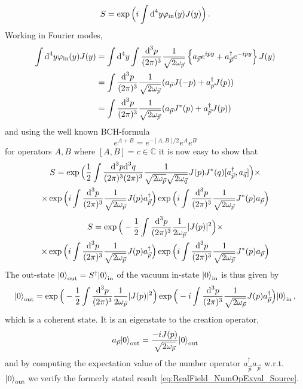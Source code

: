 \begin{equation}
    S=\exp\Big({i}\int\text{d}^4y\varphi_{\text{in}}(y)J(y)\Big)\,.
\end{equation}
Working in Fourier modes,
\begin{align}
    \int\text{d}^4y\varphi_{\text{in}}(y)J(y)&=\int\text{d}^4y\int\frac{\text{d} ^3p}{(2\pi)^3}\frac{1}{\sqrt{2\omega_{\vec{p}}}}\left\{a_{\vec{p}}e^{{i} py}+a_{\vec{p}}^\dagger e^{-{i} py}\right\}J(y)\\
    &=\int\frac{\text{d} ^3p}{(2\pi)^3}\frac{1}{\sqrt{2\omega_{\vec{p}}}}(a_{\vec{p}}J(-p)+a_{\vec{p}}^\dagger J(p))\\
    &=\int\frac{\text{d} ^3p}{(2\pi)^3}\frac{1}{\sqrt{2\omega_{\vec{p}}}}(a_{\vec{p}}J^*(p)+a_{\vec{p}}^\dagger J(p))
\end{align}
and using the well known BCH-formula
\begin{equation}
    e^{A+B}=e^{-[A,B]/2}e^Ae^B
\end{equation}
for operators ${A,B}$ where ${[A,B]=c\in\mathbb{C}}$ it is now easy to show that
\begin{multline}
    S=\exp\Big(\frac{1}{2}\int\frac{\text{d}^3p\text{d}^3q}{(2\pi)^3(2\pi)^3}\frac{1}{\sqrt{2\omega_{\vec{p}}}\sqrt{2\omega_{\vec{q}}}}J(p)J^*(q)[a_{\vec{p}}^\dagger,a_{\vec{q}}]\Big)\times\\
    \times\exp\Big({i}\int\frac{\text{d} ^3p}{(2\pi)^3}\frac{1}{\sqrt{2\omega_{\vec{p}}}}J(p)a_{\vec{p}}^\dagger\Big)\exp\Big({i}\int\frac{\text{d} ^3p}{(2\pi)^3}\frac{1}{\sqrt{2\omega_{\vec{p}}}}J^*(p)a_{\vec{p}}\Big)
\end{multline}
\begin{multline}
    S=\exp\Big(-\frac{1}{2}\int\frac{\text{d}^3p}{(2\pi)^3}\frac{1}{2\omega_{\vec{p}}}\vert J(p)\vert^2\Big)\times\\
    \times\exp\Big({i}\int\frac{\text{d} ^3p}{(2\pi)^3}\frac{1}{\sqrt{2\omega_{\vec{p}}}}J(p)a_{\vec{p}}^\dagger\Big)\exp\Big({i}\int\frac{\text{d} ^3p}{(2\pi)^3}\frac{1}{\sqrt{2\omega_{\vec{p}}}}J^*(p)a_{\vec{p}}\Big)
\end{multline}
The out-state ${{\lvert0\rangle}_{\text{out}}=S^\dagger{\lvert0\rangle}_{\text{in}}}$ of the vacuum in-state ${\lvert0\rangle}_{\text{in}}$ is thus given by
\begin{equation}
    {\lvert0\rangle}_{\text{out}}=\exp\Big(-\frac{1}{2}\int\frac{\text{d}^3p}{(2\pi)^3}\frac{1}{2\omega_{\vec{p}}}\vert J(p)\vert^2\Big)\exp\Big(-{i}\int\frac{\text{d} ^3p}{(2\pi)^3}\frac{1}{\sqrt{2\omega_{\vec{p}}}}J(p)a_{\vec{p}}^\dagger\Big){\lvert0\rangle}_{\text{in}}\,,
\end{equation}
which is a coherent state. It is an eigenstate to the creation operator,
\begin{equation}
    a_{\vec{p}}{\lvert0\rangle}_{\text{out}}=\frac{-{i} J(p)}{\sqrt{2\omega_{\vec{p}}}}{\lvert0\rangle}_{\text{out}}
\end{equation}
and by computing the expectation value of the number operator ${a^\dagger_{\vec{p}}a_{\vec{p}}}$ w.r.t. ${\lvert0\rangle}_{\text{out}}$ we verify the formerly stated result \eqref{eq:RealField_NumOpExval_Source}.


